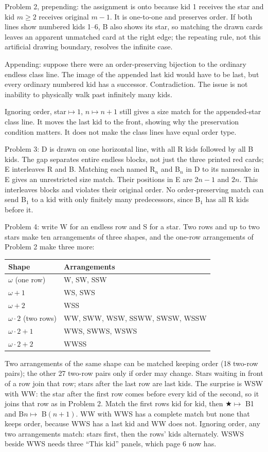 \documentclass[11pt,letterpaper]{article}
\begin{document}
Problem 2, prepending: the assignment is onto because kid 1 receives the star and kid $m\ge2$ receives original $m-1$. It is one-to-one and preserves order. If both lines show numbered kids 1--6, B also shows its star, so matching the drawn cards leaves an apparent unmatched card at the right edge; the repeating rule, not this artificial drawing boundary, resolves the infinite case.

Appending: suppose there were an order-preserving bijection to the ordinary endless class line. The image of the appended last kid would have to be last, but every ordinary numbered kid has a successor. Contradiction. The issue is not inability to physically walk past infinitely many kids.

Ignoring order, star$\mapsto1$, $n\mapsto n+1$ still gives a size match for the appended-star class line. It moves the last kid to the front, showing why the preservation condition matters. It does not make the class lines have equal order type.

Problem 3: D is drawn on one horizontal line, with all R kids followed by all B kids. The gap separates entire endless blocks, not just the three printed red cards; E interleaves R and B. Matching each named R$_n$ and B$_n$ in D to its namesake in E gives an unrestricted size match. Their positions in E are $2n-1$ and $2n$. This interleaves blocks and violates their original order. No order-preserving match can send B$_1$ to a kid with only finitely many predecessors, since B$_1$ has all R kids before it.

Problem 4: write W for an endless row and S for a star. Two rows and up to two stars make ten arrangements of three shapes, and the one-row arrangements of Problem 2 make three more:
\begin{center}\begin{tabular}{@{}ll@{}}
Shape & Arrangements\\\hline
$\omega$ (one row) & W, SW, SSW\\
$\omega+1$ & WS, SWS\\
$\omega+2$ & WSS\\
$\omega\cdot2$ (two rows) & WW, SWW, WSW, SSWW, SWSW, WSSW\\
$\omega\cdot2+1$ & WWS, SWWS, WSWS\\
$\omega\cdot2+2$ & WWSS
\end{tabular}\end{center}
Two arrangements of the same shape can be matched keeping order (18 two-row pairs); the other 27 two-row pairs only if order may change. Stars waiting in front of a row join that row; stars after the last row are last kids. The surprise is WSW with WW: the star after the first row comes before every kid of the second, so it joins that row as in Problem 2. Match the first rows kid for kid, then $\bigstar\mapsto$ B1 and B$n\mapsto$ B$(n+1)$. WW with WWS has a complete match but none that keeps order, because WWS has a last kid and WW does not. Ignoring order, any two arrangements match: stars first, then the rows' kids alternately. WSWS beside WWS needs three ``This kid'' panels, which page 6 now has.
\end{document}
